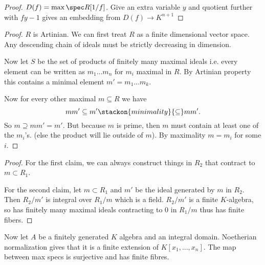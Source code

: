 \begin{proof}
    $D(f)=\max\spec R[1/f]$. Give an extra variable $y$ and quotient further with $fy-1$ gives an embedding from $D(f)\to K^{n+1}$
\end{proof}

\begin{proof}
    $R$ is Artinian. We can first treat $R$ as a finite dimensional vector space. Any descending chain of ideals must be strictly decreasing in dimension. 

    Now let $S$ be the set of products of finitely many maximal ideals i.e. every element can be written as $m_1...m_n$ for $m_i$ maximal in $R$. By Artinian property this contains a minimal element $m'=m_1...m_k$. 

    Now for every other maximal $m\subseteq R$ we have \[
    mm'\subseteq m' \stackon{minimality}{\subseteq}mm'.
    \]
    So $m\supseteq mm'=m'$. But because $m$ is prime, then $m$ must contain at least one of the $m_i$'s. (else the product will lie outside of $m$). By maximality $m=m_i$ for some $i$.
\end{proof}
\begin{proof}
    For the first claim, we can always construct things in $R_2$ that contract to $m\subset R_1$.

    For the second claim, let $m\subset R_1$ and $m'$ be the ideal generated by $m$ in $R_2$. Then $R_2/m'$ is integral over $R_1/m$ which is a field. $R_2/m'$ is a finite $K$-algebra, so has finitely many maximal ideals contracting to $0$ in $R_1/m$ thus has finite fibers.
\end{proof}
Now let $A$ be a finitely generated $K$ algebra and an integral domain. Noetherian normalization gives that it is a finite extension of $K[x_1,...,x_n]$. The map between max specs is surjective and has finite fibres.


